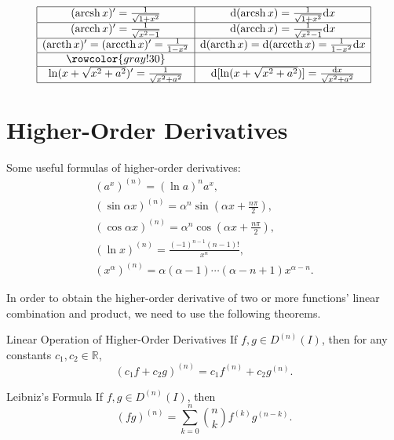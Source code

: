 \documentclass[11pt]{../../TexTemplate/elegantbook}
\begin{document}
\[\begin{array}{|c|c|}
\hline
(\mathrm{arcsh}\,x)'=\frac{1}{\sqrt{1+x^2}} & \mathrm{d}(\mathrm{arcsh}\,x)=\frac{1}{\sqrt{1+x^2}}\mathrm{d}x \\
\hline
(\mathrm{arcch}\,x)'=\frac{1}{\sqrt{x^2-1}} & \mathrm{d}(\mathrm{arcch}\,x)=\frac{1}{\sqrt{x^2-1}}\mathrm{d}x \\
\hline
(\mathrm{arcth}\,x)'=(\mathrm{arccth}\,x)'=\frac{1}{1-x^2} & 
    \mathrm{d}(\mathrm{arcth}\,x)=\mathrm{d}(\mathrm{arccth}\,x)=\frac{1}{1-x^2}\mathrm{d}x \\ \hline
\rowcolor{gray!30} & \\ \hline
\ln(x+\sqrt{x^2+a^2})'=\frac{1}{\sqrt{x^2+a^2}} & \mathrm{d}[\ln(x+\sqrt{x^2+a^2})]=\frac{\mathrm{d}x}{\sqrt{x^2+a^2}} \\
\hline
\end{array}
\]

\section{Higher-Order Derivatives}

Some useful formulas of higher-order derivatives:
\begin{gather*}
    (a^{x})^{(n)} = (\ln a)^n a^x,\\
    (\sin \alpha x)^{(n)} = \alpha^n \sin\left(\alpha x + \frac{n\pi}{2}\right), \\
    (\cos \alpha x)^{(n)} = \alpha^n \cos\left(\alpha x + \frac{n\pi}{2}\right),\\
    (\ln x)^{(n)} = \frac{(-1)^{n-1}(n-1)!}{x^n}, \\ 
    (x^\alpha)^{(n)} = \alpha(\alpha-1)\cdots(\alpha-n+1)x^{\alpha-n}.
\end{gather*}

In order to obtain the higher-order derivative of two or more functions' linear combination and product,
we need to use the following theorems.

\begin{theorem}{Linear Operation of Higher-Order Derivatives}
    If \(f,g\in D^{(n)}(I)\), then for any constants \(c_{1}, c_{2}\in \mathbb{R}\),
    \[
        (c_{1}f + c_{2}g)^{(n)} = c_{1}f^{(n)} + c_{2}g^{(n)}.
    \]
\end{theorem}

\begin{theorem}{Leibniz's Formula}
    If \(f,g\in D^{(n)}(I)\), then
    \[
        (fg)^{(n)} = \sum_{k=0}^{n} \binom{n}{k} f^{(k)} g^{(n-k)}.
    \]
\end{theorem}
\end{document}
